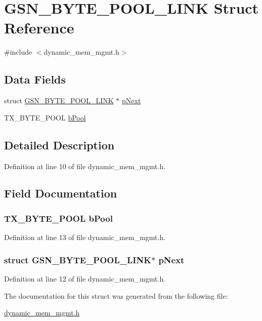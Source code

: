 \hypertarget{a00035}{
\section{GSN\_\-BYTE\_\-POOL\_\-LINK Struct Reference}
\label{a00035}
}


{\ttfamily \#include $<$dynamic\_\-mem\_\-mgmt.h$>$}

\subsection*{Data Fields}
\begin{DoxyCompactItemize}
\item 
struct \hyperlink{a00035}{GSN\_\-BYTE\_\-POOL\_\-LINK} $\ast$ \hyperlink{a00035_aa2d2d1b9266736bae7f54f8e5cd130b8}{pNext}
\item 
TX\_\-BYTE\_\-POOL \hyperlink{a00035_a4e87a2403fd992c7580039515e3d0dd8}{bPool}
\end{DoxyCompactItemize}


\subsection{Detailed Description}


Definition at line 10 of file dynamic\_\-mem\_\-mgmt.h.



\subsection{Field Documentation}
\hypertarget{a00035_a4e87a2403fd992c7580039515e3d0dd8}{
\subsubsection[{bPool}]{\setlength{\rightskip}{0pt plus 5cm}TX\_\-BYTE\_\-POOL {\bf bPool}}}
\label{a00035_a4e87a2403fd992c7580039515e3d0dd8}


Definition at line 13 of file dynamic\_\-mem\_\-mgmt.h.

\hypertarget{a00035_aa2d2d1b9266736bae7f54f8e5cd130b8}{
\subsubsection[{pNext}]{\setlength{\rightskip}{0pt plus 5cm}struct {\bf GSN\_\-BYTE\_\-POOL\_\-LINK}$\ast$ {\bf pNext}}}
\label{a00035_aa2d2d1b9266736bae7f54f8e5cd130b8}


Definition at line 12 of file dynamic\_\-mem\_\-mgmt.h.



The documentation for this struct was generated from the following file:\begin{DoxyCompactItemize}
\item 
\hyperlink{a00470}{dynamic\_\-mem\_\-mgmt.h}\end{DoxyCompactItemize}
